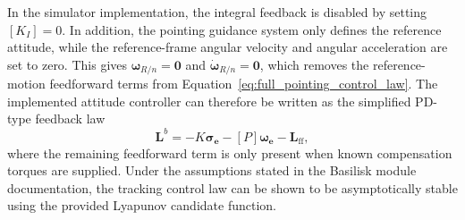In the simulator implementation, the integral feedback is disabled by setting $[K_I]=0$. In addition, the pointing guidance system only defines the reference attitude, while the reference-frame angular velocity and angular acceleration are set to zero. This gives $\boldsymbol{\omega}_{R/n}=\mathbf{0}$ and $\dot{\boldsymbol{\omega}}_{R/n}=\mathbf{0}$, which removes the reference-motion feedforward terms from Equation~\ref{eq:full_pointing_control_law}. The implemented attitude controller can therefore be written as the simplified PD-type feedback law
\begin{equation}
    \mathbf{L}^b = -K\boldsymbol{\sigma_{e}} - [P]\boldsymbol{\omega_e} - \mathbf{L}_{\mathrm{ff}},
    \label{eq:simplified_pointing_control_law}
\end{equation}
where the remaining feedforward term is only present when known compensation torques are supplied. Under the assumptions stated in the Basilisk module documentation, the tracking control law can be shown to be asymptotically stable using the provided Lyapunov candidate function.

